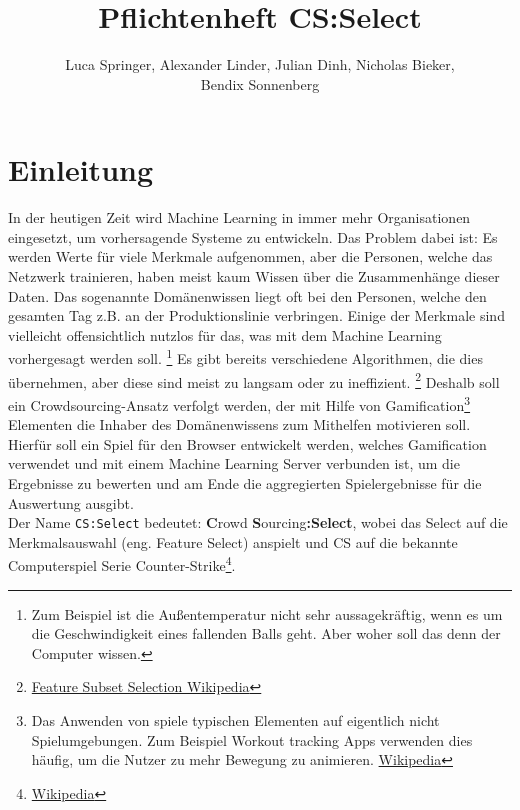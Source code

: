\documentclass[a4paper]{scrreprt}
\begin{document}
    \title{Pflichtenheft CS:Select}
    \author{Luca Springer, Alexander Linder, Julian Dinh, Nicholas Bieker,\\ Bendix Sonnenberg}
    \maketitle

    \tableofcontents

    \chapter{Einleitung}
        In der heutigen Zeit wird Machine Learning in immer mehr Organisationen eingesetzt, um vorhersagende Systeme zu entwickeln.
        Das Problem dabei ist: Es werden Werte für viele Merkmale aufgenommen, aber die Personen, welche das Netzwerk trainieren, haben meist kaum Wissen über die Zusammenhänge dieser Daten.
        Das sogenannte Domänenwissen liegt oft bei den Personen, welche den gesamten Tag z.B. an der Produktionslinie verbringen. Einige der Merkmale sind vielleicht offensichtlich nutzlos
        für das, was mit dem Machine Learning vorhergesagt werden soll. \footnote{Zum Beispiel ist die Außentemperatur nicht sehr aussagekräftig, wenn es um die Geschwindigkeit eines fallenden
        Balls geht. Aber woher soll das denn der Computer wissen.} Es gibt bereits verschiedene Algorithmen, die dies übernehmen, aber diese sind meist zu langsam oder zu ineffizient.
        \footnote{\href{https://de.wikipedia.org/wiki/Feature\_Subset\_Selection}{Feature Subset Selection Wikipedia}} 
        Deshalb soll ein Crowdsourcing-Ansatz verfolgt werden, der mit Hilfe von Gamification\footnote{Das Anwenden von spiele typischen Elementen auf eigentlich nicht Spielumgebungen. Zum Beispiel Workout tracking Apps verwenden dies häufig, um die Nutzer zu mehr Bewegung zu animieren. \href{https://de.wikipedia.org/wiki/Gamification}{Wikipedia}} Elementen die Inhaber des Domänenwissens
        zum Mithelfen motivieren soll. \\
        Hierfür soll ein Spiel für den Browser entwickelt werden, welches Gamification verwendet und mit einem Machine Learning Server verbunden ist, um die Ergebnisse zu bewerten und am
        Ende die aggregierten Spielergebnisse für die Auswertung ausgibt.
        \\
        Der Name \texttt{CS:Select} bedeutet: \textbf{C}rowd \textbf{S}ourcing\textbf{:Select}, wobei das Select auf die Merkmalsauswahl (eng. Feature Select) anspielt und CS auf die bekannte
        Computerspiel Serie Counter-Strike\footnote{\href{https://de.wikipedia.org/wiki/Counter-Strike}{Wikipedia}}.
\end{document}
